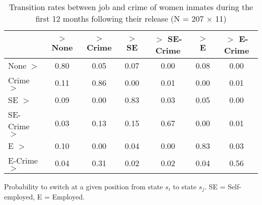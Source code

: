 \begin{table}[htp]
\footnotesize
\setlength{\tabcolsep}{10pt}
\renewcommand{\arraystretch}{1.3}
\begin{threeparttable}
\centering
\caption{Transition rates between job and crime of women inmates \newline
    during the first 12 months following their release (N = 207 $\times$ 11)} 
\label{tab:transition_rates_jobs_crime}
\begin{tabular}{lcccccc}
  \hline
 & $>$ None & $>$ Crime & $>$ SE & $>$ SE-Crime & $>$ E & $>$ E-Crime \\ 
  \hline
None $>$ & 0.80 & 0.05 & 0.07 & 0.00 & 0.08 & 0.00 \\ 
  Crime $>$ & 0.11 & 0.86 & 0.00 & 0.01 & 0.00 & 0.01 \\ 
  SE $>$ & 0.09 & 0.00 & 0.83 & 0.03 & 0.05 & 0.00 \\ 
  SE-Crime $>$ & 0.03 & 0.13 & 0.15 & 0.67 & 0.00 & 0.01 \\ 
  E $>$ & 0.10 & 0.00 & 0.04 & 0.00 & 0.83 & 0.03 \\ 
  E-Crime $>$ & 0.04 & 0.31 & 0.02 & 0.02 & 0.04 & 0.56 \\ 
   \hline
\end{tabular}
\begin{tablenotes}
\scriptsize
\item Probability to switch at a given position from state $s_i$ to state $s_j$. SE = Self-employed, E = Employed.
\end{tablenotes}
\end{threeparttable}
\end{table}
